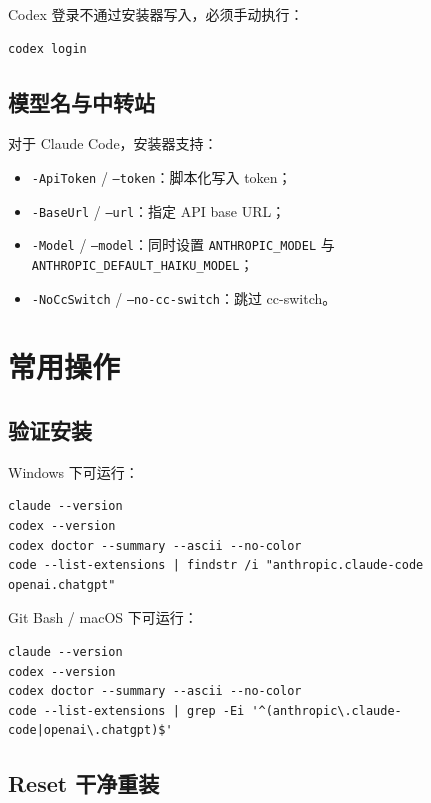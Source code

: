 \documentclass[11pt,a4paper]{ctexbook}
\begin{document}
Codex 登录不通过安装器写入，必须手动执行：

\begin{lstlisting}[language={}]
codex login
\end{lstlisting}

\section{模型名与中转站}

对于 Claude Code，安装器支持：

\begin{itemize}[leftmargin=2em]
  \item \texttt{-ApiToken} / \texttt{--token}：脚本化写入 token；
  \item \texttt{-BaseUrl} / \texttt{--url}：指定 API base URL；
  \item \texttt{-Model} / \texttt{--model}：同时设置 \texttt{ANTHROPIC\_MODEL} 与 \texttt{ANTHROPIC\_DEFAULT\_HAIKU\_MODEL}；
  \item \texttt{-NoCcSwitch} / \texttt{--no-cc-switch}：跳过 cc-switch。
\end{itemize}

\chapter{常用操作}

\section{验证安装}

Windows 下可运行：

\begin{lstlisting}[language={}]
claude --version
codex --version
codex doctor --summary --ascii --no-color
code --list-extensions | findstr /i "anthropic.claude-code openai.chatgpt"
\end{lstlisting}

Git Bash / macOS 下可运行：

\begin{lstlisting}[language={}]
claude --version
codex --version
codex doctor --summary --ascii --no-color
code --list-extensions | grep -Ei '^(anthropic\.claude-code|openai\.chatgpt)$'
\end{lstlisting}

\section{Reset 干净重装}
\end{document}
